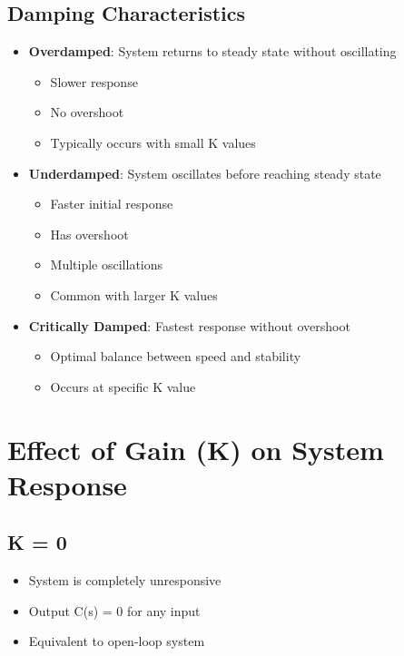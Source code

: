 \documentclass{article}
\begin{document}
\subsection{Damping Characteristics}
\begin{itemize}
    \item \textbf{Overdamped}: System returns to steady state without oscillating
        \begin{itemize}
            \item Slower response
            \item No overshoot
            \item Typically occurs with small K values
        \end{itemize}
    \item \textbf{Underdamped}: System oscillates before reaching steady state
        \begin{itemize}
            \item Faster initial response
            \item Has overshoot
            \item Multiple oscillations
            \item Common with larger K values
        \end{itemize}
    \item \textbf{Critically Damped}: Fastest response without overshoot
        \begin{itemize}
            \item Optimal balance between speed and stability
            \item Occurs at specific K value
        \end{itemize}
\end{itemize}

\section{Effect of Gain (K) on System Response}

\subsection{K = 0}
\begin{itemize}
    \item System is completely unresponsive
    \item Output C(s) = 0 for any input
    \item Equivalent to open-loop system
\end{itemize}
\end{document}
